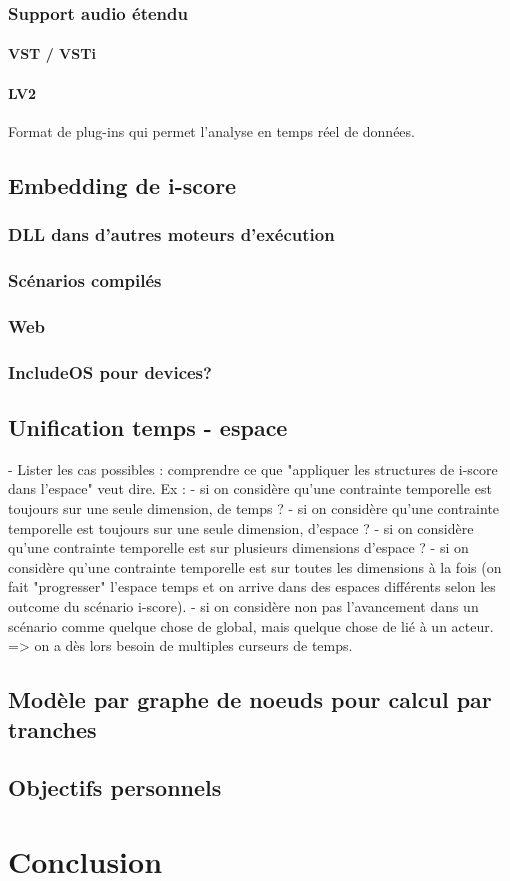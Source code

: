 \documentclass[french,a4paper]{book}
\begin{document}
\subsection{Support audio étendu}
\subsubsection{VST / VSTi}
\subsubsection{LV2}
Format de plug-ins qui permet l'analyse en temps réel de données.

\section{Embedding de i-score}
\subsection{DLL dans d'autres moteurs d'exécution}
\subsection{Scénarios compilés}
\subsection{Web}
\subsection{IncludeOS pour devices?}

\section{Unification temps - espace}
- Lister les cas possibles : comprendre 
ce que "appliquer les structures de i-score dans l'espace" veut dire.
Ex : 
- si on considère qu'une contrainte temporelle est toujours sur une seule dimension, de temps ?
- si on considère qu'une contrainte temporelle est toujours sur une seule dimension, d'espace ? 
- si on considère qu'une contrainte temporelle est sur plusieurs dimensions d'espace ? 
- si on considère qu'une contrainte temporelle est sur toutes les dimensions à la fois (on fait "progresser" l'espace temps et on arrive dans des espaces différents selon les outcome du scénario i-score).
- si on considère non pas l'avancement dans un scénario comme quelque chose de global, mais quelque chose de lié à un acteur.
=> on a dès lors besoin de multiples curseurs de temps.
\section{Modèle par graphe de noeuds pour calcul par tranches}
\section{Objectifs personnels}
\chapter{Conclusion}
\end{document}
